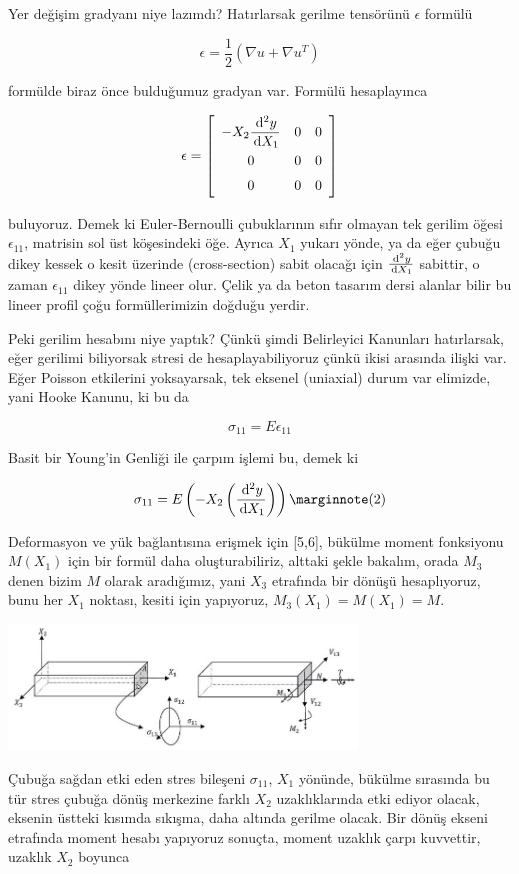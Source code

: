 \documentclass[12pt,fleqn]{article}\usepackage{../../common}
\begin{document}
Yer değişim gradyanı niye lazımdı? Hatırlarsak gerilme tensörünü $\epsilon$
formülü

$$
\epsilon = \frac{1}{2} (\nabla u + \nabla u^T )
$$

formülde biraz önce bulduğumuz gradyan var. Formülü hesaplayınca 

$$
\renewcommand*{\arraystretch}{1.5}
\epsilon = \left[\begin{array}{ccc}
-X_2 \dfrac{\ud^2 y}{\ud X_1} & 0 & 0 \\
0 & 0 & 0 \\
0 & 0 & 0 
\end{array}\right]
$$

buluyoruz. Demek ki Euler-Bernoulli çubuklarının sıfır olmayan tek gerilim öğesi
$\epsilon_{11}$, matrisin sol üst köşesindeki öğe. Ayrıca $X_1$ yukarı yönde, ya
da eğer çubuğu dikey kessek o kesit üzerinde (cross-section) sabit olacağı için
$\frac{\,\mathrm{d}^2 y}{\,\mathrm{d} X_1}$ sabittir, o zaman $\epsilon_{11}$ dikey yönde lineer
olur. Çelik ya da beton tasarım dersi alanlar bilir bu lineer profil çoğu
formüllerimizin doğduğu yerdir.

Peki gerilim hesabını niye yaptık? Çünkü şimdi Belirleyici Kanunları
hatırlarsak, eğer gerilimi biliyorsak stresi de hesaplayabiliyoruz çünkü ikisi
arasında ilişki var. Eğer Poisson etkilerini yoksayarsak, tek eksenel (uniaxial)
durum var elimizde, yani Hooke Kanunu, ki bu da

$$
\sigma_{11} = E \epsilon_{11}
$$

Basit bir Young'in Genliği ile çarpım işlemi bu, demek ki

$$
\sigma_{11} = E \left( -X_2 \left( \dfrac{\ud^2 y}{\ud X_1} \right) \right)
\mlabel{2}
$$

Deformasyon ve yük bağlantısına erişmek için [5,6], bükülme moment fonksiyonu
$M(X_1)$ için bir formül daha oluşturabiliriz, alttaki şekle bakalım, orada
$M_3$ denen bizim $M$ olarak aradığımız, yani $X_3$ etrafında bir dönüşü
hesaplıyoruz, bunu her $X_1$ noktası, kesiti için yapıyoruz, $M_3(X_1) = M(X_1)
= M$.

\includegraphics[width=25em]{phy_020_strs_02_15.jpg}

Çubuğa sağdan etki eden stres bileşeni $\sigma_{11}$, $X_1$ yönünde, bükülme
sırasında bu tür stres çubuğa dönüş merkezine farklı $X_2$ uzaklıklarında etki
ediyor olacak, eksenin üstteki kısımda sıkışma, daha altında gerilme olacak. Bir
dönüş ekseni etrafında moment hesabı yapıyoruz sonuçta, moment uzaklık çarpı
kuvvettir, uzaklık $X_2$ boyunca
\end{document}
